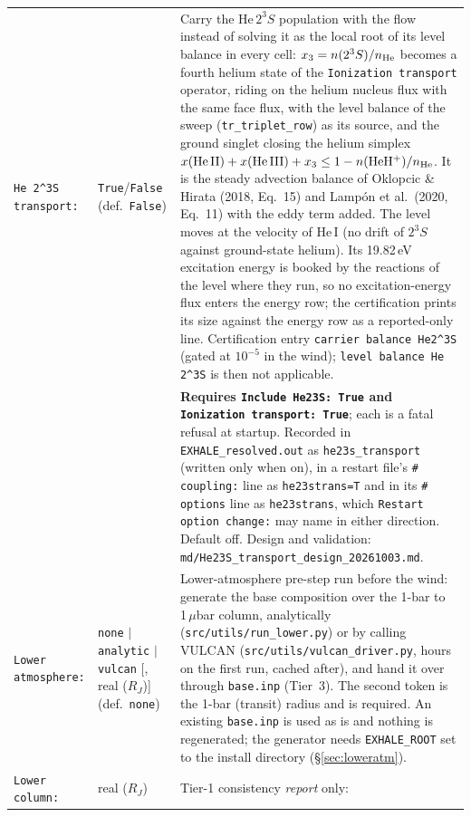 \documentclass[english,a4paper]{my_memo}
\begin{document}
\begin{longtable}{@{}p{}p{}p{}@{}}
\texttt{He 2\^{}3S transport:} & \texttt{True}/\texttt{False}
  (def.\ \texttt{False}) & Carry the He\,$2^3S$ population with the flow
  instead of solving it as the local root of its level balance in every cell:
  $x_3 = n(2^3S)/n_{\rm He}$ becomes a fourth helium state of the
  \texttt{Ionization transport} operator, riding on the helium nucleus flux
  with the same face flux, with the level balance of the sweep
  (\texttt{tr\_triplet\_row}) as its source, and the ground singlet closing
  the helium simplex $x({\rm He\,II}) + x({\rm He\,III}) + x_3 \le 1 -
  n({\rm HeH^+})/n_{\rm He}$. It is the steady advection balance of Oklopcic
  \& Hirata (2018, Eq.~15) and Lamp\'on et al.\ (2020, Eq.~11) with the eddy
  term added. The level moves at the velocity of He\,I (no drift of $2^3S$
  against ground-state helium). Its 19.82\,eV excitation energy is booked by
  the reactions of the level where they run, so no excitation-energy flux
  enters the energy row; the certification prints its size against the energy
  row as a reported-only line. Certification entry \texttt{carrier balance
  He2\^{}3S} (gated at $10^{-5}$ in the wind); \texttt{level balance He 2\^{}3S}
  is then not applicable.
  \\
  & &  \textbf{Requires \texttt{Include He23S: True} and
  \texttt{Ionization transport: True}}; each is a fatal refusal at startup.
  Recorded in \texttt{EXHALE\_resolved.out} as \texttt{he23s\_transport}
  (written only when on), in a restart file's \texttt{\# coupling:} line as
  \texttt{he23strans=T} and in its \texttt{\# options} line as
  \texttt{he23strans}, which \texttt{Restart option change:} may name in
  either direction. Default off. Design and validation:
  \texttt{md/He23S\_transport\_design\_20261003.md}. \\
\texttt{Lower atmosphere:} & \texttt{none} $|$ \texttt{analytic} $|$
  \texttt{vulcan} [, real ($R_J$)] (def.\ \texttt{none}) & Lower-atmosphere
  pre-step run before the wind: generate the base composition over the 1-bar to
  1\,$\mu$bar column, analytically (\texttt{src/utils/run\_lower.py}) or by
  calling VULCAN (\texttt{src/utils/vulcan\_driver.py}, hours on the first run,
  cached after), and hand it over through \texttt{base.inp} (Tier~3). The
  second token is the 1-bar (transit) radius and is required. An existing
  \texttt{base.inp} is used as is and nothing is regenerated; the generator
  needs \texttt{EXHALE\_ROOT} set to the install directory
  (\S\ref{sec:loweratm}). \\
\texttt{Lower column:} & real ($R_J$) & Tier-1 consistency \emph{report} only:

\end{longtable}
\end{document}
